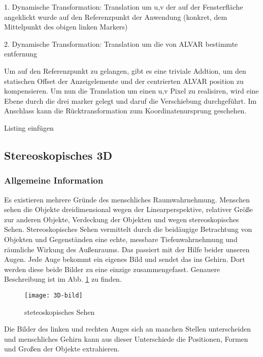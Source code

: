 {    1. Dynamische Transformation:  Translation  um u,v der auf der Fensterfläche angeklickt wurde auf den Referenzpunkt der Anwendung (konkret, dem Mittelpunkt des obigen linken Markers) 

    2. Dynamische Transformation: Translation um die von ALVAR bestimmte entfernung

Um auf den Referenzpunkt zu gelangen, gibt es eine triviale Addtion, um den statischen Offset der Anzeigelemente und der centrierten ALVAR position zu kompensieren. Um nun die Translation um einen u,v Pixel zu realisiren, wird eine Ebene durch die drei marker gelegt und daruf die Verschiebung durchgeführt. Im Anschlass kann die Rücktransformation zum Koordinatenursprung geschehen.

    Listing einfügen



\subsection{Stereoskopisches 3D}

\subsubsection{Allgemeine Information}
Es existieren mehrere Gründe des menschliches Raumwahrnehmung.
Menschen sehen die Objekte dreidimensional wegen der Linearperspektive, relativer Größe zur anderen Objekte, Verdeckung der Objekten und wegen stereoskopisches Sehen. 
Stereoskopisches Sehen vermittelt durch die beidäugige Betrachtung von Objekten und Gegenständen eine echte, messbare Tiefenwahrnehmung und räumliche Wirkung des Außenraums. 
Das passiert mit der Hilfe beider unseren Augen.
Jede Auge bekommt ein eigenes Bild und sendet das ins Gehirn. 
Dort werden diese beide Bilder zu eine einzige zusammengefasst.
Genauere Beschreibung ist im Abb. \ref{fig:3D} zu finden.

\begin{figure}[h]
   \centering
   \texttt{[image: 3D-bild]}
   \caption{steteoskopisches Sehen}
   \label{fig:3D}
\end{figure}

Die Bilder des linken und rechten Auges sich an manchen Stellen unterscheiden und menschliches Gehirn kann aus dieser Unterschiede die Positionen, Formen und Großen der Objekte extrahieren.

}
